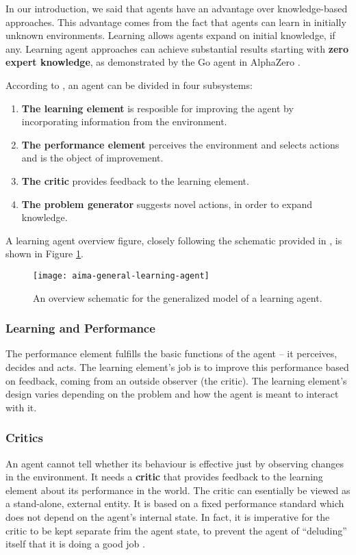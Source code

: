 In our introduction, we said that agents have an advantage over knowledge-based approaches.
This advantage comes from the fact that agents can learn in initially unknown environments.
Learning allows agents expand on initial knowledge, if any.
Learning agent approaches can achieve substantial results starting with \textbf{zero expert knowledge}, as demonstrated by the Go agent in AlphaZero \cite{alpha-zero}.

According to \cite{aima}, an agent can be divided in four subsystems:
\begin{enumerate}
    \item \textbf{The learning element} is resposible for improving the agent by incorporating information from the environment.
    \item \textbf{The performance element} perceives the environment and selects actions and is the object of improvement.
    \item \textbf{The critic} provides feedback to the learning element.
    \item \textbf{The problem generator} suggests novel actions, in order to expand knowledge.    
\end{enumerate}

A learning agent overview figure, closely following the schematic provided in \cite{aima}, is shown in Figure \ref{fig:aima-learning-agent}.

\begin{figure}[ht]
    \texttt{[image: aima-general-learning-agent]}
    \centering
    \caption{An overview schematic for the generalized model of a learning agent.}
    \label{fig:aima-learning-agent}
\end{figure}

\subsubsection{Learning and Performance}
The performance element fulfills the basic functions of the agent -- it perceives, decides and acts.
The learning element's job is to improve this performance based on feedback, coming from an outside observer (the critic).
The learning element's design varies depending on the problem and how the agent is meant to interact with it.

\subsubsection{Critics}
An agent cannot tell whether its behaviour is effective just by observing changes in the environment.
It needs a \textbf{critic} that provides feedback to the learning element about its performance in the world.
The critic can esentially be viewed as a stand-alone, external entity.
It is based on a fixed performance standard which does not depend on the agent's internal state.
In fact, it is imperative for the critic to be kept separate frim the agent state, to prevent the agent of ``deluding'' itself that it is doing a good job \cite{aima}.

